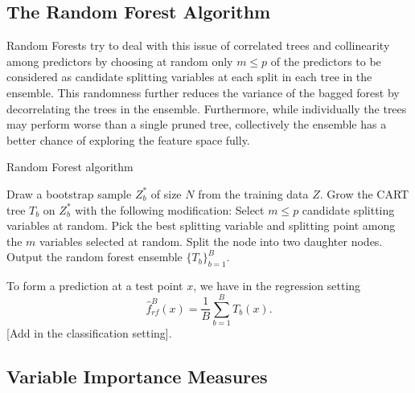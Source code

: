 \documentclass[12pt,twoside]{reedthesis}
\theoremstyle{definition}
\theoremstyle{definition}
\theoremstyle{definition}
\theoremstyle{remark}
\begin{document}
\subsection{The Random Forest
Algorithm}\label{the-random-forest-algorithm}

Random Forests try to deal with this issue of correlated trees and
collinearity among predictors by choosing at random only \(m\leq p\) of
the predictors to be considered as candidate splitting variables at each
split in each tree in the ensemble. This randomness further reduces the
variance of the bagged forest by decorrelating the trees in the
ensemble. Furthermore, while individually the trees may perform worse
than a single pruned tree, collectively the ensemble has a better chance
of exploring the feature space fully.
\begin{algorithm}
        \caption{Random Forest algorithm}\label{random forest}
        \begin{algorithmic}[1]
            \State Draw a bootstrap sample $Z_b^*$ of size $N$ from the training data $Z$.
            \State Grow the CART tree $T_b$ on $Z_b^*$ with the following modification:
            \State Select $m\leq p$ candidate splitting variables at random.
            \State Pick the best splitting variable and splitting point among the $m$ variables selected at random.
            \State Split the node into two daughter nodes.
            \EndWhile
            \EndFor
            \State Output the random forest ensemble $\{T_b\}_{b=1}^B$.
        \end{algorithmic}
    \end{algorithm}
To form a prediction at a test point \(x\), we have in the regression
setting \[\hat{f}_{rf}^B(x)=\frac{1}{B}\sum_{b=1}^B T_b(x).\] {[}Add in
the classification setting{]}.

\subsection{Variable Importance
Measures}\label{variable-importance-measures}
\end{document}
